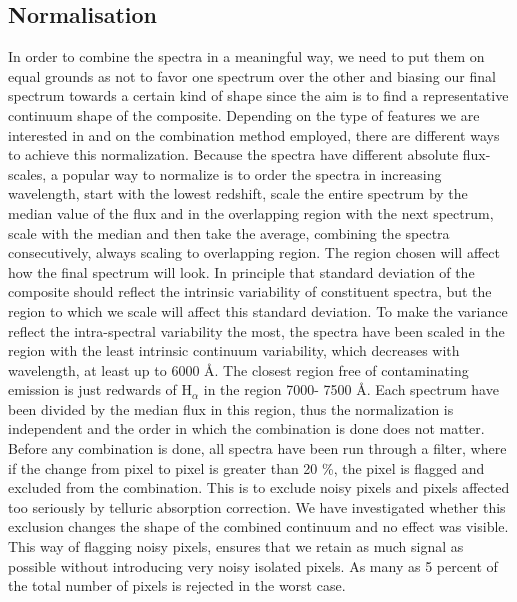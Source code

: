 \documentclass{aa}    %
\newcommand{\sectlabel}[1]{\label{sect:#1}}
\begin{document}
\subsection{Normalisation}  \sectlabel{norm}

In order to combine the spectra in a meaningful way, we need to put them on equal grounds as not to favor one spectrum over the other and biasing our final spectrum towards a certain kind of shape since the aim is to find a representative continuum shape of the composite. Depending on the type of features we are interested in and on the combination method employed, there are different ways to achieve this normalization. Because the spectra have different absolute flux-scales, a popular way to normalize is to order the spectra in increasing wavelength, start with the lowest redshift, scale the entire spectrum by the median value of the flux and in the overlapping region with the next spectrum, scale with the median and then take the average, combining the spectra consecutively, always scaling to overlapping region. The region chosen will affect how the final spectrum will look\citep{Francis1991,Brotherton2000,VandenBerk2001,Glikman2006}.
In principle that standard deviation of the composite should reflect the intrinsic variability of constituent spectra, but the region to which we scale will affect this standard deviation. To make the variance reflect the intra-spectral variability the most, the spectra have been scaled in the region with the least intrinsic continuum variability, which decreases with wavelength, at least up to 6000 \AA \citep{VandenBerk2004}. The closest region free of contaminating emission is just redwards of H$_\alpha$ in the region 7000- 7500 \AA. Each spectrum have been divided by the median flux in this region, thus the normalization is independent and the order in which the combination is done does not matter. 
Before any combination is done, all spectra have been run through a filter, where if the change from pixel to pixel is greater than 20 \%, the pixel is flagged and excluded from the combination. This is to exclude noisy pixels and pixels affected too seriously by telluric absorption correction. We have investigated whether this exclusion changes the shape of the combined continuum and no effect was visible. This way of flagging noisy pixels, ensures that we retain as much signal as possible without introducing very noisy isolated pixels. As many as 5 percent of the total number of pixels is rejected in the worst case. 
\end{document}
